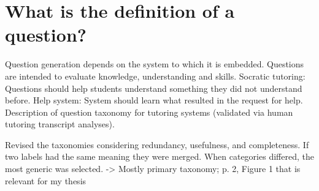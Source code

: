 \begin{comment}
For flawed/non-working code, answers usually includes improvement suggestions. 
Best practices, improved readability in addition to working solution suggestion.
\item Pedagogical benefit, since those asking questions learn to write better code.
\item Highlighting important elements: 
"Straight to the point", clearing up misunderstandings, pointing to relevant resources, etc.
\item Step-by-step solution: 
Splitting code into chunks, and explaining each chunk. 
Explanation on how things work. 
Comparison of languages; e.g. "How can I do X in C\#, when I'm used to Java?"
\item Providing links to extra resources: 
Keeping answer short by adding external links. 
A summary of said link should still be included (e.g. if site goes down, is un-available, etc).
\end{enumerate}
\end{comment} 

\section{What is the definition of a question?}
\label{sec:question_definition}

Question generation depends on the system to which it is embedded. 
Questions are intended to evaluate knowledge, understanding and skills. 
Socratic tutoring: Questions should help students understand something they did not understand before. 
Help system: System should learn what resulted in the request for help. 
Description of question taxonomy for tutoring systems (validated via human tutoring transcript analyses).

Revised the taxonomies considering redundancy, usefulness, and completeness. 
If two labels had the same meaning they were merged. 
When categories differed, the most generic was selected.
	-> Mostly primary taxonomy; p. 2, Figure 1 that is relevant for my thesis
\cite{Nielsen2008}


